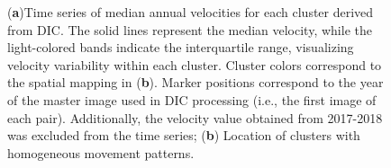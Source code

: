 \begin{figure}
    \centering
     \quad
    \caption{(\textbf{a})Time series of median annual velocities for each cluster derived from DIC. The solid lines represent the median velocity, while the light-colored bands indicate the interquartile range, visualizing velocity variability within each cluster. Cluster colors correspond to the spatial mapping in (\textbf{b}). Marker positions correspond to the year of the master image used in DIC processing (i.e., the first image of each pair). Additionally, the velocity value obtained from 2017-2018 was excluded from the time series; (\textbf{b}) Location of clusters with homogeneous movement patterns.}
    \label{fig:3:velocity_time_series}
\end{figure}

